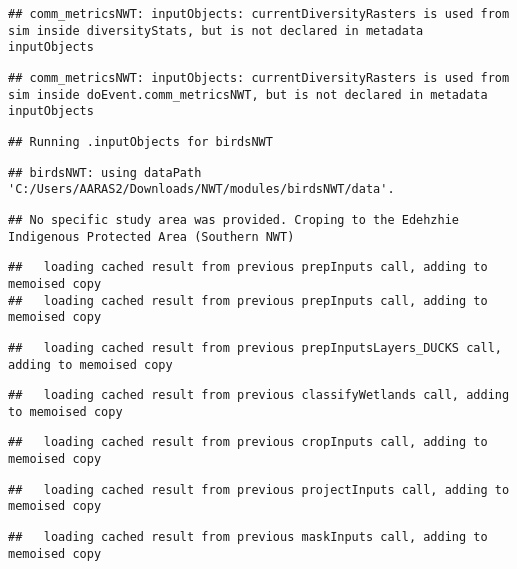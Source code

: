 \documentclass[]{article}
\begin{document}
\begin{verbatim}
## comm_metricsNWT: inputObjects: currentDiversityRasters is used from sim inside diversityStats, but is not declared in metadata inputObjects
\end{verbatim}

\begin{verbatim}
## comm_metricsNWT: inputObjects: currentDiversityRasters is used from sim inside doEvent.comm_metricsNWT, but is not declared in metadata inputObjects
\end{verbatim}

\begin{verbatim}
## Running .inputObjects for birdsNWT
\end{verbatim}

\begin{verbatim}
## birdsNWT: using dataPath 'C:/Users/AARAS2/Downloads/NWT/modules/birdsNWT/data'.
\end{verbatim}

\begin{verbatim}
## No specific study area was provided. Croping to the Edehzhie Indigenous Protected Area (Southern NWT)
\end{verbatim}

\begin{verbatim}
##   loading cached result from previous prepInputs call, adding to memoised copy
##   loading cached result from previous prepInputs call, adding to memoised copy
\end{verbatim}

\begin{verbatim}
##   loading cached result from previous prepInputsLayers_DUCKS call, adding to memoised copy
\end{verbatim}

\begin{verbatim}
##   loading cached result from previous classifyWetlands call, adding to memoised copy
\end{verbatim}

\begin{verbatim}
##   loading cached result from previous cropInputs call, adding to memoised copy
\end{verbatim}

\begin{verbatim}
##   loading cached result from previous projectInputs call, adding to memoised copy
\end{verbatim}

\begin{verbatim}
##   loading cached result from previous maskInputs call, adding to memoised copy
\end{verbatim}
\end{document}
